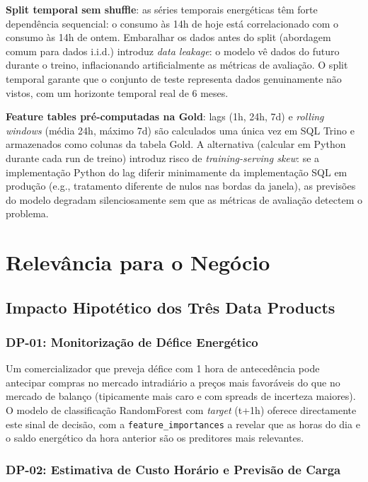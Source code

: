 \documentclass[11pt,a4paper]{article}
\begin{document}
\textbf{Split temporal sem shuffle}: as séries temporais energéticas têm forte dependência sequencial: o consumo às 14h de hoje está correlacionado com o consumo às 14h de ontem. Embaralhar os dados antes do split (abordagem comum para dados i.i.d.) introduz \textit{data leakage}: o modelo vê dados do futuro durante o treino, inflacionando artificialmente as métricas de avaliação. O split temporal garante que o conjunto de teste representa dados genuinamente não vistos, com um horizonte temporal real de 6 meses.

\textbf{Feature tables pré-computadas na Gold}: lags (1h, 24h, 7d) e \textit{rolling windows} (média 24h, máximo 7d) são calculados uma única vez em SQL Trino e armazenados como colunas da tabela Gold. A alternativa (calcular em Python durante cada run de treino) introduz risco de \textit{training-serving skew}: se a implementação Python do lag diferir minimamente da implementação SQL em produção (e.g., tratamento diferente de nulos nas bordas da janela), as previsões do modelo degradam silenciosamente sem que as métricas de avaliação detectem o problema.

\section{Relevância para o Negócio}

\subsection{Impacto Hipotético dos Três Data Products}

\subsubsection{DP-01: Monitorização de Défice Energético}

Um comercializador que preveja défice com 1 hora de antecedência pode antecipar compras no mercado intradiário a preços mais favoráveis do que no mercado de balanço (tipicamente mais caro e com spreads de incerteza maiores). O modelo de classificação RandomForest com \textit{target}  (t+1h) oferece directamente este sinal de decisão, com a \texttt{feature\_importances} a revelar que as horas do dia e o saldo energético da hora anterior são os preditores mais relevantes.

\subsubsection{DP-02: Estimativa de Custo Horário e Previsão de Carga}
\end{document}
